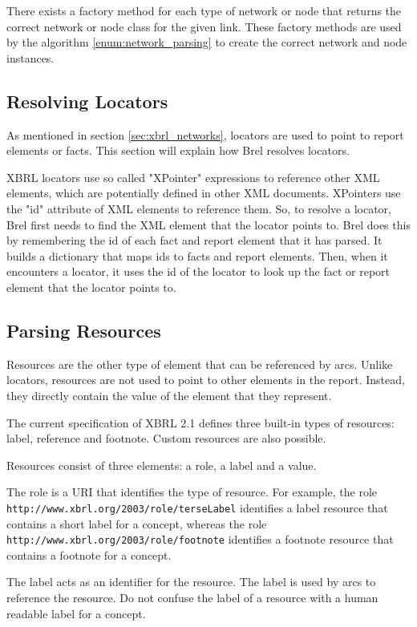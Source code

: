 There exists a factory method for each type of network or node that returns the correct network or node class for the given link.
These factory methods are used by the algorithm \ref{enum:network_parsing} to create the correct network and node instances.

\subsection{Resolving Locators}

As mentioned in section \ref{sec:xbrl_networks}, locators are used to point to report elements or facts.
This section will explain how Brel resolves locators.

XBRL locators use so called "XPointer" expressions to reference other XML elements, which are potentially defined in other XML documents.\cite{w3_xpointer}
XPointers use the "id" attribute of XML elements to reference them.
So, to resolve a locator, Brel first needs to find the XML element that the locator points to.
Brel does this by remembering the id of each fact and report element that it has parsed.
It builds a dictionary that maps ids to facts and report elements.
Then, when it encounters a locator, it uses the id of the locator to look up the fact or report element that the locator points to.

\subsection{Parsing Resources}

Resources are the other type of element that can be referenced by arcs.
Unlike locators, resources are not used to point to other elements in the report.
Instead, they directly contain the value of the element that they represent.

The current specification of XBRL 2.1 defines three built-in types of resources: label, reference and footnote.
Custom resources are also possible.

Resources consist of three elements: a role, a label and a value.

The role is a URI that identifies the type of resource.
For example, the role \texttt{http://www.xbrl.org/2003/role/terseLabel} identifies a label resource that contains a short label for a concept, 
whereas the role \texttt{http://www.xbrl.org/2003/role/footnote} identifies a footnote resource that contains a footnote for a concept.

The label acts as an identifier for the resource.
The label is used by arcs to reference the resource.
Do not confuse the label of a resource with a human readable label for a concept.


